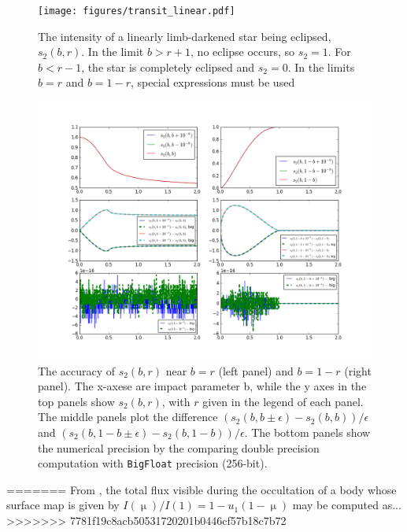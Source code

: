 \documentclass[modern]{aastex61}
\begin{document}
\begin{figure}\label{s2_plot}
\texttt{[image: figures/transit\_linear.pdf]}
\caption{The intensity of a linearly limb-darkened star being eclipsed, $s_2(b,r)$.
In the limit $b > r+1$, no eclipse occurs, so $s_2=1$.  For $b < r-1$, the star
is completely eclipsed and $s_2=0$.  In the limits $b=r$ and $b=1-r$, special
expressions must be used}
\end{figure}

\begin{figure}\label{s2_machine}
\includegraphics[width=0.85\linewidth]{figures/s2_machine.png}
\caption{The accuracy of $s_2(b,r)$ near $b=r$ (left panel) and
$b=1-r$ (right panel). The x-axese are impact parameter b,
while the y axes in the top panels show $s_2(b,r)$, with $r$
given in the legend of each panel. The middle panels plot
the difference $(s_2(b,b\pm\epsilon)-s_2(b,b))/\epsilon$
and $(s_2(b,1-b\pm\epsilon)-s_2(b,1-b))/\epsilon$. The bottom
panels show the numerical precision by the comparing double precision
computation with \texttt{BigFloat} precision (256-bit).
}
\end{figure}




=======
From \citet{MandelAgol2002}, the total flux visible during the occultation of a  
body whose surface map is given by $I(\upmu)/I(1) = 1 - u_1(1 - \upmu)$ may be computed
as...
>>>>>>> 7781f19c8acb50531720201b0446cf57b18c7b72
\end{document}
